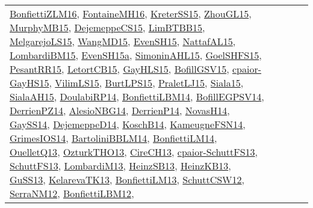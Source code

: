 {\begin{longtable}{lp{3cm}>{\raggedright}p{6cm}>{\raggedright}p{6cm}p{8cm}}
\href{papers/BonfiettiZLM16.pdf}{BonfiettiZLM16}\cite{BonfiettiZLM16}, \href{papers/FontaineMH16.pdf}{FontaineMH16}\cite{FontaineMH16}, \href{papers/KreterSS15.pdf}{KreterSS15}\cite{KreterSS15}, \href{papers/ZhouGL15.pdf}{ZhouGL15}\cite{ZhouGL15}, \href{papers/MurphyMB15.pdf}{MurphyMB15}\cite{MurphyMB15}, \href{papers/DejemeppeCS15.pdf}{DejemeppeCS15}\cite{DejemeppeCS15}, \href{papers/LimBTBB15.pdf}{LimBTBB15}\cite{LimBTBB15}, \href{papers/MelgarejoLS15.pdf}{MelgarejoLS15}\cite{MelgarejoLS15}, \href{articles/WangMD15.pdf}{WangMD15}\cite{WangMD15}, \href{papers/EvenSH15.pdf}{EvenSH15}\cite{EvenSH15}, \href{articles/NattafAL15.pdf}{NattafAL15}\cite{NattafAL15}, \href{papers/LombardiBM15.pdf}{LombardiBM15}\cite{LombardiBM15}, \href{articles/EvenSH15a.pdf}{EvenSH15a}\cite{EvenSH15a}, \href{articles/SimoninAHL15.pdf}{SimoninAHL15}\cite{SimoninAHL15}, \href{articles/GoelSHFS15.pdf}{GoelSHFS15}\cite{GoelSHFS15}, \href{papers/PesantRR15.pdf}{PesantRR15}\cite{PesantRR15}, \href{articles/LetortCB15.pdf}{LetortCB15}\cite{LetortCB15}, \href{papers/GayHLS15.pdf}{GayHLS15}\cite{GayHLS15}, \href{papers/BofillGSV15.pdf}{BofillGSV15}\cite{BofillGSV15}, \href{papers/cpaior-GayHS15.pdf}{cpaior-GayHS15}\cite{cpaior-GayHS15}, \href{papers/VilimLS15.pdf}{VilimLS15}\cite{VilimLS15}, \href{papers/BurtLPS15.pdf}{BurtLPS15}\cite{BurtLPS15}, \href{papers/PraletLJ15.pdf}{PraletLJ15}\cite{PraletLJ15}, \href{articles/Siala15.pdf}{Siala15}\cite{Siala15}, \href{papers/SialaAH15.pdf}{SialaAH15}\cite{SialaAH15}, \href{papers/DoulabiRP14.pdf}{DoulabiRP14}\cite{DoulabiRP14}, \href{articles/BonfiettiLBM14.pdf}{BonfiettiLBM14}\cite{BonfiettiLBM14}, \href{papers/BofillEGPSV14.pdf}{BofillEGPSV14}\cite{BofillEGPSV14}, \href{papers/DerrienPZ14.pdf}{DerrienPZ14}\cite{DerrienPZ14}, \href{papers/AlesioNBG14.pdf}{AlesioNBG14}\cite{AlesioNBG14}, \href{papers/DerrienP14.pdf}{DerrienP14}\cite{DerrienP14}, \href{articles/NovasH14.pdf}{NovasH14}\cite{NovasH14}, \href{papers/GaySS14.pdf}{GaySS14}\cite{GaySS14}, \href{papers/DejemeppeD14.pdf}{DejemeppeD14}\cite{DejemeppeD14}, \href{papers/KoschB14.pdf}{KoschB14}\cite{KoschB14}, \href{articles/KameugneFSN14.pdf}{KameugneFSN14}\cite{KameugneFSN14}, \href{articles/GrimesIOS14.pdf}{GrimesIOS14}\cite{GrimesIOS14}, \href{papers/BartoliniBBLM14.pdf}{BartoliniBBLM14}\cite{BartoliniBBLM14}, \href{papers/BonfiettiLM14.pdf}{BonfiettiLM14}\cite{BonfiettiLM14}, \href{papers/OuelletQ13.pdf}{OuelletQ13}\cite{OuelletQ13}, \href{articles/OzturkTHO13.pdf}{OzturkTHO13}\cite{OzturkTHO13}, \href{papers/CireCH13.pdf}{CireCH13}\cite{CireCH13}, \href{papers/cpaior-SchuttFS13.pdf}{cpaior-SchuttFS13}\cite{cpaior-SchuttFS13}, \href{papers/SchuttFS13.pdf}{SchuttFS13}\cite{SchuttFS13}, \href{papers/LombardiM13.pdf}{LombardiM13}\cite{LombardiM13}, \href{articles/HeinzSB13.pdf}{HeinzSB13}\cite{HeinzSB13}, \href{papers/HeinzKB13.pdf}{HeinzKB13}\cite{HeinzKB13}, \href{papers/GuSS13.pdf}{GuSS13}\cite{GuSS13}, \href{papers/KelarevaTK13.pdf}{KelarevaTK13}\cite{KelarevaTK13}, \href{papers/BonfiettiLM13.pdf}{BonfiettiLM13}\cite{BonfiettiLM13}, \href{papers/SchuttCSW12.pdf}{SchuttCSW12}\cite{SchuttCSW12}, \href{papers/SerraNM12.pdf}{SerraNM12}\cite{SerraNM12}, \href{papers/BonfiettiLBM12.pdf}{BonfiettiLBM12}\cite{BonfiettiLBM12}, 
\end{longtable}}

